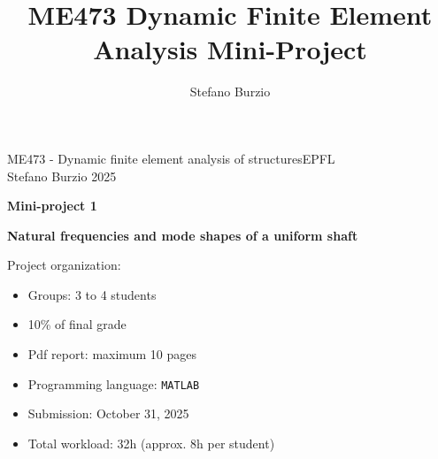 \documentclass[12pt]{article}
\title{ME473 Dynamic Finite Element Analysis Mini-Project}
\author{Stefano Burzio}
\date{}
\begin{document}
\pagestyle{empty}

\noindent ME473 - Dynamic finite element analysis of structures\hfill EPFL\\
Stefano Burzio \hfill 2025\\
\vspace{0.3cm}

\hspace*{\fill}\textbf{\Large Mini-project 1}\hspace*{\fill}
\begin{center}
  \textbf{\Large Natural frequencies and mode shapes of a uniform shaft}
\end{center}

\hrulefill
\vspace{0.3cm}
\newline
{Project organization:}
\vspace{0.2cm}
\newline
\begin{minipage}[t]{0.38\textwidth}
  \begin{itemize}[itemsep=0.005cm]
    \item Groups: 3 to 4 students
    \item 10\% of final grade
    \item Pdf report: maximum 10 pages
  \end{itemize}
\end{minipage}
\hfill
\begin{minipage}[t]{0.58\textwidth}
  \begin{itemize}[itemsep=0.005cm]
    \item Programming language: \texttt{MATLAB}
    \item Submission: October 31, 2025
    \item Total workload:  32h (approx. 8h per student)
  \end{itemize}
\end{minipage}
\vspace{0.3cm}

\hrulefill
\vspace{0.3cm}
\end{document}
